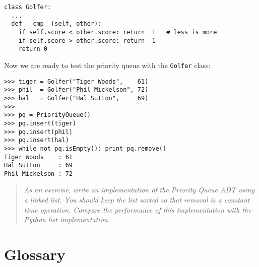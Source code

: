 \beforeverb
\begin{verbatim}
class Golfer:
  ...
  def __cmp__(self, other):
    if self.score < other.score: return  1   # less is more
    if self.score > other.score: return -1
    return 0
\end{verbatim}
\afterverb
%
Now we are ready to test the priority queue with the {\tt Golfer} class:

\beforeverb
\begin{verbatim}
>>> tiger = Golfer("Tiger Woods",    61)
>>> phil  = Golfer("Phil Mickelson", 72)
>>> hal   = Golfer("Hal Sutton",     69)
>>>
>>> pq = PriorityQueue()
>>> pq.insert(tiger)
>>> pq.insert(phil)
>>> pq.insert(hal)
>>> while not pq.isEmpty(): print pq.remove()
Tiger Woods    : 61
Hal Sutton     : 69
Phil Mickelson : 72
\end{verbatim}
\afterverb

\begin{quote}
{\em As an exercise, write an implementation of the Priority Queue ADT 
using a linked list.  You should keep the list sorted so that removal
is a constant time operation.  Compare the performance of this
implementation with the Python list implementation.}
\end{quote}


\section{Glossary}

